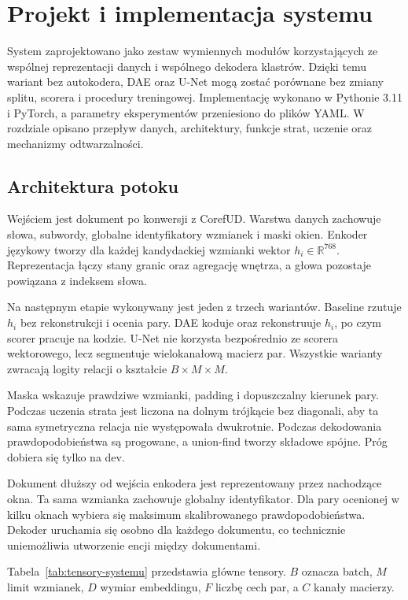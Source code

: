 \chapter{Projekt i implementacja systemu}
\label{chap:system}

System zaprojektowano jako zestaw wymiennych modułów korzystających ze wspólnej reprezentacji danych i wspólnego dekodera klastrów. Dzięki temu wariant bez autokodera, DAE oraz U-Net mogą zostać porównane bez zmiany splitu, scorera i procedury treningowej. Implementację wykonano w Pythonie 3.11 i PyTorch, a parametry eksperymentów przeniesiono do plików YAML. W rozdziale opisano przepływ danych, architektury, funkcje strat, uczenie oraz mechanizmy odtwarzalności.

\section{Architektura potoku}
\label{sec:architektura-potoku}

Wejściem jest dokument po konwersji z CorefUD. Warstwa danych zachowuje słowa, subwordy, globalne identyfikatory wzmianek i maski okien. Enkoder językowy tworzy dla każdej kandydackiej wzmianki wektor $h_i\in\mathbb{R}^{768}$. Reprezentacja łączy stany granic oraz agregację wnętrza, a głowa pozostaje powiązana z indeksem słowa.

Na następnym etapie wykonywany jest jeden z trzech wariantów. Baseline rzutuje $h_i$ bez rekonstrukcji i ocenia pary. DAE koduje oraz rekonstruuje $h_i$, po czym scorer pracuje na kodzie. U-Net nie korzysta bezpośrednio ze scorera wektorowego, lecz segmentuje wielokanałową macierz par. Wszystkie warianty zwracają logity relacji o kształcie $B\times M\times M$.

Maska wskazuje prawdziwe wzmianki, padding i dopuszczalny kierunek pary. Podczas uczenia strata jest liczona na dolnym trójkącie bez diagonali, aby ta sama symetryczna relacja nie występowała dwukrotnie. Podczas dekodowania prawdopodobieństwa są progowane, a union-find tworzy składowe spójne. Próg dobiera się tylko na dev.

Dokument dłuższy od wejścia enkodera jest reprezentowany przez nachodzące okna. Ta sama wzmianka zachowuje globalny identyfikator. Dla pary ocenionej w kilku oknach wybiera się maksimum skalibrowanego prawdopodobieństwa. Dekoder uruchamia się osobno dla każdego dokumentu, co technicznie uniemożliwia utworzenie encji między dokumentami.

Tabela~\ref{tab:tensory-systemu} przedstawia główne tensory. $B$ oznacza batch, $M$ limit wzmianek, $D$ wymiar embeddingu, $F$ liczbę cech par, a $C$ kanały macierzy.


